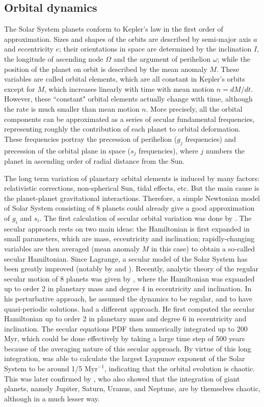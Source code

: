 \documentclass[12pt]{article}
\newcounter{para}[subsection]
\begin{document}
	\subsection{Orbital dynamics}
	The Solar System planets conform to Kepler's law in the first order of approximation. Sizes and shapes of the orbits are described by semi-major axis $a$ and eccentricity $e$; their orientations in space are determined by the inclination $I$, the longitude of ascending node $\Omega$ and the argument of perihelion $\omega$; while the position of the planet on orbit is described by the mean anomaly $M$. These variables are called orbital elements, which are all constant in Kepler's orbits except for $M$, which increases linearly with time with mean motion $n = dM/dt$. However, these ``constant" orbital elements actually change with time, although the rate is much smaller than mean motion $n$. More precisely, all the orbital components can be approximated as a series of secular fundamental frequencies, representing roughly the contribution of each planet to orbital deformation. These frequencies portray the precession of perihelion ($g_j$ frequencies) and precession of the orbital plane in space ($s_j$ frequencies), where $j$ numbers the planet in ascending order of radial distance from the Sun.
	
	
	The long term variation of planetary orbital elements is induced by many factors: relativistic corrections, non-spherical Sun, tidal effects, etc. But the main cause is the planet-planet gravitational interactions. Therefore, a simple Newtonian model of Solar System consisting of 8 planets could already give a good approximation of $g_i$ and $s_i$.
	The first calculation of secular orbital variation was done by \cite{lagrange1782theorie}. The secular approach rests on two main ideas: the Hamiltonian is first expanded in small parameters, which are mass, eccentricity and inclination; rapidly-changing variables are then averaged (mean anomaly $M$ in this case) to obtain a so-called secular Hamiltonian. Since Lagrange, a secular model of the Solar System has been greatly improved (notably by \cite{le1856} and \cite{Hill1873}).
	Recently, analytic theory of the regular secular motion of 8 planets was given by \cite{bretagnon1974termes}, where the Hamiltonian was expanded up to order 2 in planetary mass and degree 4 in eccentricity and inclination. In his perturbative approach, he assumed the dynamics to be regular, and to have quasi-periodic solutions.
	\citet{laskar1985} had a different approach. He first computed the secular Hamiltonian up to order 2 in planetary mass and degree 6 in eccentricity and inclination. The secular equations PDF then numerically integrated up to 200 Myr, which could be done effectively by taking a large time step of 500 years because of the averaging nature of this secular approach. By virtue of this long integration, \cite{laskar1989} was able to calculate the largest Lyapunov exponent of the Solar System to be around 1/5 $\text{Myr}^{-1}$, indicating that the orbital evolution is chaotic. This was later confirmed by \cite{sussman1992}, who also showed that the integration of giant planets, namely Jupiter, Saturn, Uranus, and Neptune, are by themselves chaotic, although in a much lesser way.
	
\end{document}
